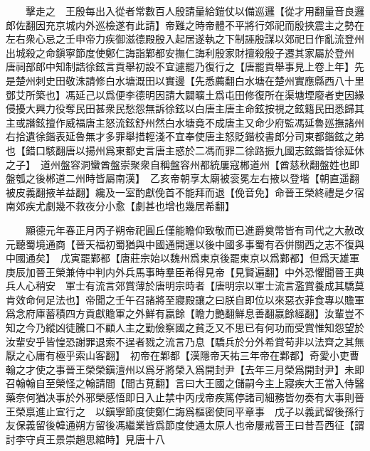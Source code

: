 　　擊走之　王殷每出入從者常數百人殷請量給鎧仗以備巡邏【從才用翻量音良邏郎佐翻因充京城内外巡檢遂有此請】帝難之時帝體不平將行郊祀而殷挾震主之勢在左右衆心忌之壬申帝力疾御滋德殿殷入起居遂執之下制誣殷謀以郊祀日作亂流登州出城殺之命鎭寧節度使鄭仁誨詣鄴都安撫仁誨利殷家財擅殺殷子遷其家屬於登州　唐祠部郎中知制誥徐鉉言貢舉初設不宜遽罷乃復行之【唐罷貢舉事見上卷上年】先是楚州刺史田敬洙請修白水塘溉田以實邊【先悉薦翻白水塘在楚州實應縣西八十里鄧艾所築也】馮延己以爲便李德明因請大闢曠土爲屯田修復所在渠塘堙廢者吏因緣侵擾大興力役奪民田甚衆民愁怨無訴徐鉉以白唐主唐主命鉉按視之鉉籍民田悉歸其主或譖鉉擅作威福唐主怒流鉉舒州然白水塘竟不成唐主又命少府監馮延魯廵撫諸州右拾遺徐鍇表延魯無才多罪舉措輕淺不宜奉使唐主怒貶鍇校書郎分司東都鍇鉉之弟也【錯口駭翻唐以揚州爲東都史言唐主惑於二馮而罪二徐路振九國志鉉鍇皆徐延休之子】　道州盤容洞蠻酋盤崇聚衆自稱盤容州都統屢寇郴道州【酋慈秋翻盤姓也即盤瓠之後郴道二州時皆屬南漢】　乙亥帝朝享太廟被衮冕左右掖以登堦【朝直遥翻被皮義翻掖羊益翻】纔及一室酌獻俛首不能拜而退【俛音免】命晉王榮終禮是夕宿南郊疾尤劇幾不救夜分小愈【劇甚也增也幾居希翻】

　　顯德元年春正月丙子朔帝祀圓丘僅能瞻仰致敬而已進爵奠幣皆有司代之大赦改元聽蜀境通商【晉天福初蜀猶與中國通開運以後中國多事蜀有吞併關西之志不復與中國通矣】　戊寅罷鄴都【唐莊宗始以魏州爲東京後罷東京以爲鄴都】但爲天雄軍　庚辰加晉王榮兼侍中判内外兵馬事時羣臣希得見帝【見賢遍翻】中外恐懼聞晉王典兵人心稍安　軍士有流言郊賞薄於唐明宗時者【唐明宗以軍士流言濫賞養成其驕莫肯效命何足法也】帝聞之壬午召諸將至寢殿讓之曰朕自即位以來惡衣菲食專以贍軍爲念府庫蓄積四方貢獻贍軍之外鮮有嬴餘【瞻力艶翻鮮息善翻嬴餘經翻】汝輩豈不知之今乃縱凶徒騰口不顧人主之勤儉察國之貧乏又不思已有何功而受賞惟知怨望於汝輩安乎皆惶恐謝罪退索不逞者戮之流言乃息【驕兵於分外希賞苟非以法齊之其無厭之心庸有極乎索山客翻】　初帝在鄴都【漢隱帝天祐三年帝在鄴都】奇愛小吏曹翰之才使之事晉王榮榮鎭澶州以爲牙將榮入爲開封尹【去年三月榮爲開封尹】未即召翰翰自至榮怪之翰請間【間古莧翻】言曰大王國之儲嗣今主上寢疾大王當入侍醫藥奈何猶决事於外邪榮感悟即日入止禁中丙戌帝疾篤停諸司細務皆勿奏有大事則晉王榮禀進止宣行之　以鎭寧節度使鄭仁誨爲樞密使同平章事　戊子以義武留後孫行友保義留後韓通朔方留後馮繼業皆爲節度使通太原人也帝屢戒晉王曰昔吾西征【謂討李守貞王景崇趙思綰時】見唐十八

